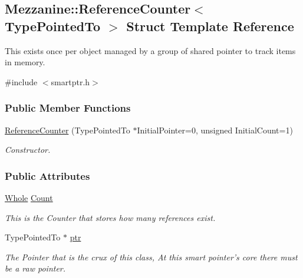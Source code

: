 \hypertarget{structMezzanine_1_1ReferenceCounter}{
\subsection{Mezzanine::ReferenceCounter$<$ TypePointedTo $>$ Struct Template Reference}
\label{structMezzanine_1_1ReferenceCounter}
}


This exists once per object managed by a group of shared pointer to track items in memory.  




{\ttfamily \#include $<$smartptr.h$>$}

\subsubsection*{Public Member Functions}
\begin{DoxyCompactItemize}
\item 
\hyperlink{structMezzanine_1_1ReferenceCounter_adda30561241ee44cd8626c16a149e979}{ReferenceCounter} (TypePointedTo $\ast$InitialPointer=0, unsigned InitialCount=1)
\begin{DoxyCompactList}\small\item\em Constructor. \item\end{DoxyCompactList}\end{DoxyCompactItemize}
\subsubsection*{Public Attributes}
\begin{DoxyCompactItemize}
\item 
\hypertarget{structMezzanine_1_1ReferenceCounter_a22e7d6bda4083df74f8aa8dd18bdad7a}{
\hyperlink{namespaceMezzanine_adcbb6ce6d1eb4379d109e51171e2e493}{Whole} \hyperlink{structMezzanine_1_1ReferenceCounter_a22e7d6bda4083df74f8aa8dd18bdad7a}{Count}}
\label{structMezzanine_1_1ReferenceCounter_a22e7d6bda4083df74f8aa8dd18bdad7a}

\begin{DoxyCompactList}\small\item\em This is the Counter that stores how many references exist. \item\end{DoxyCompactList}\item 
\hypertarget{structMezzanine_1_1ReferenceCounter_af40f0d5423982d1cf633ef091dac0cd9}{
TypePointedTo $\ast$ \hyperlink{structMezzanine_1_1ReferenceCounter_af40f0d5423982d1cf633ef091dac0cd9}{ptr}}
\label{structMezzanine_1_1ReferenceCounter_af40f0d5423982d1cf633ef091dac0cd9}

\begin{DoxyCompactList}\small\item\em The Pointer that is the crux of this class, At this smart pointer's core there must be a raw pointer. \item\end{DoxyCompactList}\end{DoxyCompactItemize}


